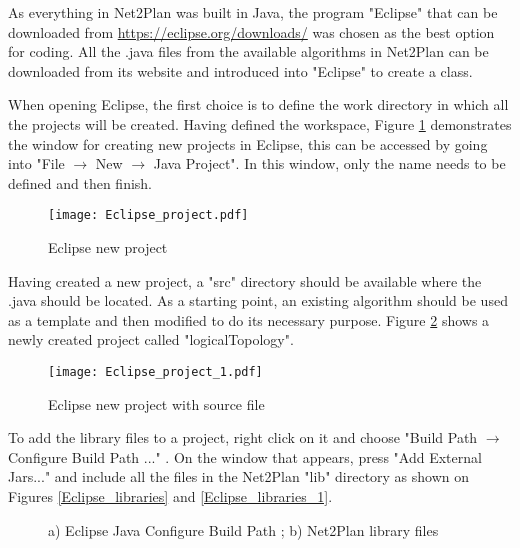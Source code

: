 	As everything in Net2Plan was built in Java, the program "Eclipse" that can be downloaded from \url{https://eclipse.org/downloads/} was chosen as the best option for coding. All the .java files from the available algorithms in Net2Plan can be downloaded from its website and introduced into "Eclipse" to create a class.
	
	When opening Eclipse, the first choice is to define the work directory in which all the projects will be created. Having defined the workspace, Figure \ref{Eclipse_project} demonstrates the window for creating new projects in Eclipse, this can be accessed by going into "File $\rightarrow$ New $\rightarrow$ Java Project". In this window, only the name needs to be defined and then finish.
	
	\vspace{1.5cm}
	\begin{figure}[h!]
		\centering
		\texttt{[image: Eclipse\_project.pdf]}
		\caption{Eclipse new project}
		\label{Eclipse_project}
	\end{figure}	
	
	\newpage
	
	Having created a new project, a "src" directory should be available where the .java should be located. As a starting point, an existing algorithm should be used as a template and then modified to do its necessary purpose. Figure \ref{Eclipse_project_1} shows a newly created project called "logicalTopology".
	
	\vspace{1.5cm}
	\begin{figure}[h!]
		\centering
		\texttt{[image: Eclipse\_project\_1.pdf]}
		\caption{Eclipse new project with source file}
		\label{Eclipse_project_1}
	\end{figure}	
	
	To add the library files to a project, right click on it and choose "Build Path $\rightarrow$ Configure Build Path ..." . On the window that appears, press "Add External Jars..." and include all the files in the Net2Plan "lib" directory as shown on Figures \ref{Eclipse_libraries} and \ref{Eclipse_libraries_1}.
	
	\vspace{1.5cm}
	\begin{figure}[!h]
		\centering
		\caption{a) Eclipse Java Configure Build Path ; b) Net2Plan library files}
	\end{figure}	
	

